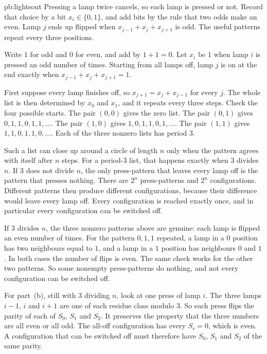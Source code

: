 \begin{solution}{pb:lightsout}
\idea Pressing a lamp twice cancels, so each lamp is pressed or not. Record that choice by a bit $x_i\in\{0,1\}$, and add bits by the rule that two odds make an even. Lamp $j$ ends up flipped when $x_{j-1}+x_j+x_{j+1}$ is odd. The useful patterns repeat every three positions.

\writeup Write $1$ for odd and $0$ for even, and add by $1+1=0$. Let $x_i$ be $1$ when lamp $i$ is pressed an odd number of times. Starting from all lamps off, lamp $j$ is on at the end exactly when $x_{j-1}+x_j+x_{j+1}=1$.

First suppose every lamp finishes off, so $x_{j+1}=x_j+x_{j-1}$ for every $j$. The whole list is then determined by $x_0$ and $x_1$, and it repeats every three steps. Check the four possible starts. The pair $(0,0)$ gives the zero list. The pair $(0,1)$ gives $0,1,1,0,1,1,\ldots$. The pair $(1,0)$ gives $1,0,1,1,0,1,\ldots$. The pair $(1,1)$ gives $1,1,0,1,1,0,\ldots$. Each of the three nonzero lists has period $3$.

Such a list can close up around a circle of length $n$ only when the pattern agrees with itself after $n$ steps. For a period-$3$ list, that happens exactly when $3$ divides $n$. If $3$ does not divide $n$, the only press-pattern that leaves every lamp off is the pattern that presses nothing. There are $2^n$ press-patterns and $2^n$ configurations. Different patterns then produce different configurations, because their difference would leave every lamp off. Every configuration is reached exactly once, and in particular every configuration can be switched off.

If $3$ divides $n$, the three nonzero patterns above are genuine: each lamp is flipped an even number of times. For the pattern $0,1,1$ repeated, a lamp in a $0$ position has two neighbours equal to $1$, and a lamp in a $1$ position has neighbours $0$ and $1$. In both cases the number of flips is even. The same check works for the other two patterns. So some nonempty press-patterns do nothing, and not every configuration can be switched off.

For part~(b), still with $3$ dividing $n$, look at one press of lamp $i$. The three lamps $i-1$, $i$ and $i+1$ are one of each residue class modulo $3$. So each press flips the parity of each of $S_0$, $S_1$ and $S_2$. It preserves the property that the three numbers are all even or all odd. The all-off configuration has every $S_r=0$, which is even. A configuration that can be switched off must therefore have $S_0$, $S_1$ and $S_2$ of the same parity.


\end{solution}
